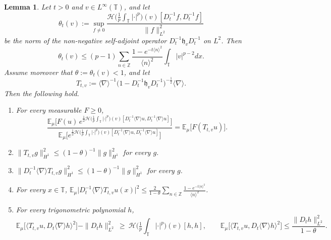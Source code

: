 \documentclass[letterpaper, 11pt,  reqno]{amsart}
\newtheorem{lemma}[theorem]{Lemma}
\theoremstyle{definition}
\newcommand{\1}{\mathbbm 1}
\newcommand{\Z}{\mathbb{Z}}
\newcommand{\T}{\mathbb{T}}
\newcommand{\0}{\mathbf 0}
\newcommand{\E}{\mathbb{E}}
\newcommand{\nb}{\nabla}
\newcommand{\jb}[1]
{\langle #1 \rangle}
\numberwithin{equation}{section}
\numberwithin{theorem}{section}
\newcommand{\HF}[2]{\mathcal H\big(\tfrac1p{\textstyle\int_\T}|\cdot|^p\big)(#1)[#2]}
\begin{document}
\begin{lemma}
\label{s4:LEM:gauss}
Let $t>0$ and $v\in L^\infty(\T)$, and let
\begin{equation}\label{s4:theta}
\theta_t(v):=\sup_{f\neq0}\frac{\HF{v}{D_t^{-1}f,D_t^{-1}f}}{\|f\|_{L^2}^2}
\end{equation}
be the norm of the non-negative self-adjoint operator $D_t^{-1}\mathfrak h_vD_t^{-1}$ on $L^2$. Then
\begin{equation}\label{s4:thetabound}
\theta_t(v)\le(p-1)\sum_{n\in\Z}\frac{1-e^{-t\jb n^2}}{\jb n^2}\int_\T|v|^{p-2}dx .
\end{equation}
Assume moreover that $\theta:=\theta_t(v)<1$, and let
\[
T_{t,v}:=\jb\nb^{-1}\big(1-D_t^{-1}\mathfrak h_vD_t^{-1}\big)^{-\frac12}\jb\nb .
\]
Then the following hold.
\begin{enumerate}
\item[(i)] For every measurable
$F\ge0$,
\[
\frac{\E_\mu\big[F(u)\,e^{\frac12\HF{v}{D_t^{-1}\jb\nb u,D_t^{-1}\jb\nb u}}\big]}{\E_\mu\big[e^{\frac12\HF{v}{D_t^{-1}\jb\nb u,D_t^{-1}\jb\nb u}}\big]}
=\E_\mu\big[F(T_{t,v}u)\big].
\]
\item[(ii)] $\|T_{t,v}g\|_{H^1}^2\le(1-\theta)^{-1}\|g\|_{H^1}^2$ for every $g$.
\item[(iii)] $\|D_t^{-1}\jb\nb T_{t,v}g\|_{H^1}^2\le(1-\theta)^{-1}\|g\|_{H^1}^2$ for every $g$.
\item[(iv)] For every $x\in\T$, $\displaystyle\E_\mu\big|D_t^{-1}\jb\nb T_{t,v}u(x)\big|^2\le\frac2{1-\theta}\sum_{n\in\Z}\frac{1-e^{-t\jb n^2}}{\jb n^2}$.
\item[(v)] For every trigonometric polynomial $h$,
\[
\E_\mu\big[\jb{T_{t,v}u,D_t\jb\nb h}^2\big]-\|D_th\|_{L^2}^2\ \ge\ \HF{v}{h,h},
\qquad
\E_\mu\big[\jb{T_{t,v}u,D_t\jb\nb h}^2\big]\le\frac{\|D_th\|_{L^2}^2}{1-\theta}.
\]
\end{enumerate}
\end{lemma}
 
\end{document}
